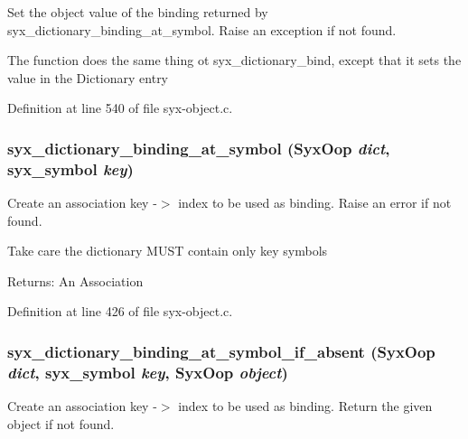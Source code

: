 Set the object value of the binding returned by syx\_\-dictionary\_\-binding\_\-at\_\-symbol. Raise an exception if not found.

The function does the same thing ot syx\_\-dictionary\_\-bind, except that it sets the value in the Dictionary entry 

Definition at line 540 of file syx-object.c.\hypertarget{syx-object_8c_b1fb0a51e91c9dfe8fed1b8258974ad8}{
\subsubsection{ syx\_\-dictionary\_\-binding\_\-at\_\-symbol ({\bf SyxOop} {\em dict}, \/  {\bf syx\_\-symbol} {\em key})}}
\label{syx-object_8c_b1fb0a51e91c9dfe8fed1b8258974ad8}


Create an association key -$>$ index to be used as binding. Raise an error if not found.

Take care the dictionary MUST contain only key symbols

\begin{Desc}
\item[Returns:]An Association \end{Desc}


Definition at line 426 of file syx-object.c.\hypertarget{syx-object_8c_778fcf3802402d6a173931cbd3e8ef42}{
\subsubsection{ syx\_\-dictionary\_\-binding\_\-at\_\-symbol\_\-if\_\-absent ({\bf SyxOop} {\em dict}, \/  {\bf syx\_\-symbol} {\em key}, \/  {\bf SyxOop} {\em object})}}
\label{syx-object_8c_778fcf3802402d6a173931cbd3e8ef42}


Create an association key -$>$ index to be used as binding. Return the given object if not found.

